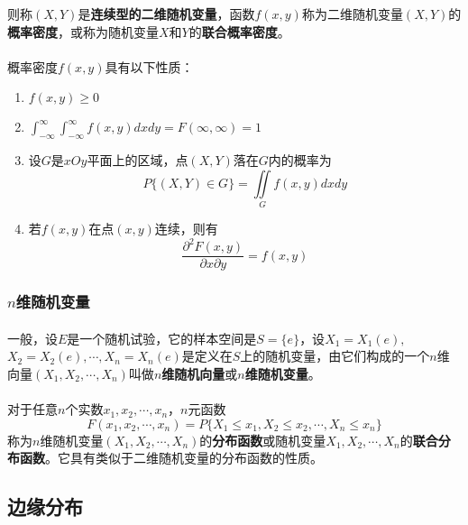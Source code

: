 则称$(X,Y)$是\textbf{连续型的二维随机变量}，函数$f(x,y)$称为二维随机变量$(X,Y)$的\textbf{概率密度}，或称为随机变量$X$和$Y$的\textbf{联合概率密度}。

\paragraph{}
概率密度$f(x,y)$具有以下性质：
\begin{enumerate}
  \item $f(x,y) \geq 0$
  \item $\int_{-\infty}^\infty\int_{-\infty}^\infty f(x,y)dxdy=F(\infty,\infty)=1$
  \item 设$G$是$xOy$平面上的区域，点$(X,Y)$落在$G$内的概率为
  \begin{equation}
    P\{(X,Y)\in G\} = \iint\limits_G f(x,y)dxdy
  \end{equation}
  \item 若$f(x,y)$在点$(x,y)$连续，则有
  \begin{equation}
    \frac{\partial^2F(x,y)}{\partial x\partial y} = f(x,y)
  \end{equation}
\end{enumerate}

\subsubsection{$n$维随机变量}
\paragraph{}
一般，设$E$是一个随机试验，它的样本空间是$S=\{e\}$，设$X_1=X_1(e),$ \\ $ X_2=X_2(e),\cdots,X_n=X_n(e)$是定义在$S$上的随机变量，由它们构成的一个$n$维向量$(X_1,X_2,\cdots,X_n)$叫做\textbf{$n$维随机向量}或\textbf{$n$维随机变量}。
\paragraph{}
对于任意$n$个实数$x_1,x_2,\cdots,x_n$，$n$元函数
\begin{equation}
  F(x_1,x_2,\cdots,x_n)=P\{X_1 \leq  x_1, X_2 \leq x_2, \cdots, X_n \leq x_n\}
\end{equation}
称为$n$维随机变量$(X_1,X_2,\cdots,X_n)$的\textbf{分布函数}或随机变量$X_1,X_2,\cdots,X_n$的\textbf{联合分布函数}。它具有类似于二维随机变量的分布函数的性质。

\subsection{边缘分布}
